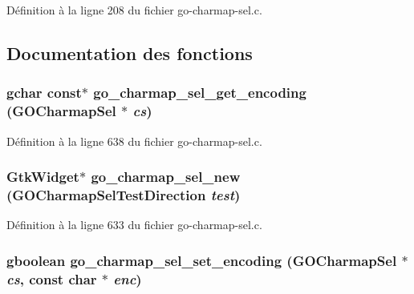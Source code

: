 Définition à la ligne 208 du fichier go-\/charmap-\/sel.c.



\subsection{Documentation des fonctions}
\subsubsection[{go\_\-charmap\_\-sel\_\-get\_\-encoding}]{\setlength{\rightskip}{0pt plus 5cm}gchar const$\ast$ go\_\-charmap\_\-sel\_\-get\_\-encoding ({\bf GOCharmapSel} $\ast$ {\em cs})}\label{go-charmap-sel_8c_a17a7ca06cfc5d9a8d0e08f764d50b7f8}


Définition à la ligne 638 du fichier go-\/charmap-\/sel.c.

\subsubsection[{go\_\-charmap\_\-sel\_\-new}]{\setlength{\rightskip}{0pt plus 5cm}GtkWidget$\ast$ go\_\-charmap\_\-sel\_\-new ({\bf GOCharmapSelTestDirection} {\em test})}\label{go-charmap-sel_8c_a68d9a2dfcd7e29cf4585e4d830abfba4}


Définition à la ligne 633 du fichier go-\/charmap-\/sel.c.

\subsubsection[{go\_\-charmap\_\-sel\_\-set\_\-encoding}]{\setlength{\rightskip}{0pt plus 5cm}gboolean go\_\-charmap\_\-sel\_\-set\_\-encoding ({\bf GOCharmapSel} $\ast$ {\em cs}, \/  const char $\ast$ {\em enc})}\label{go-charmap-sel_8c_afaad94b300355324942ac3632d75377b}



